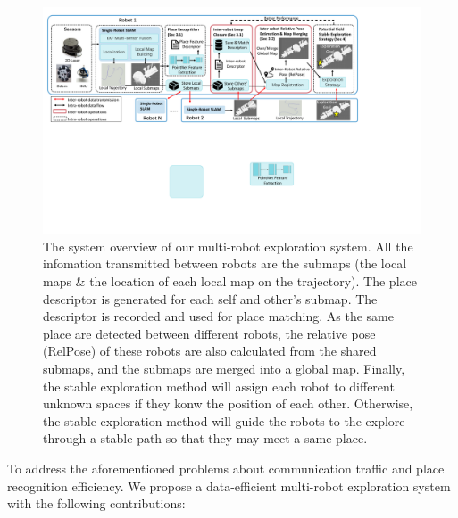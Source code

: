 \begin{figure}[t]
    \centering
    \includegraphics[width=0.99\linewidth]{fig/dataflow.pdf}
    \caption{The system overview of our multi-robot exploration system. All the infomation transmitted between robots are the submaps (the local maps \& the location of each local map on the trajectory). 
    The place descriptor is generated for each self and other's submap. The descriptor is recorded and used for place matching. 
    As the same place are detected between different robots, the relative pose (RelPose) of these robots are also calculated from the shared submaps, and the submaps are merged into a global map. 
    Finally, the stable exploration method will assign each robot to different unknown spaces if they konw the position of each other. 
    Otherwise, the stable exploration method will guide the robots to the explore through a stable path so that they may meet a same place.}
    \label{fig:sysframe}
\end{figure}


To address the aforementioned problems about communication traffic and place recognition efficiency. We propose a data-efficient multi-robot  exploration system with the following contributions:

